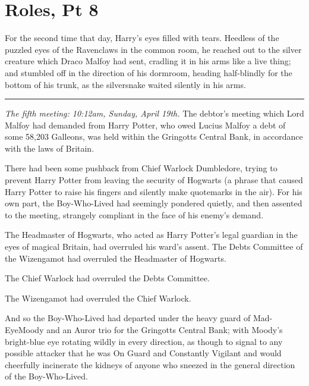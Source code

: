 \chapter{Roles, Pt 8}
For the second time that day, Harry's eyes filled with tears. Heedless of the puzzled eyes of the Ravenclaws in the common room, he reached out to the silver creature which Draco Malfoy had sent, cradling it in his arms like a live thing; and stumbled off in the direction of his dormroom, heading half-blindly for the bottom of his trunk, as the silversnake waited silently in his arms.

\begin{center}\rule{3in}{0.4pt}\end{center}

\emph{The fifth meeting: 10:12am, Sunday, April 19th.}
The debtor's meeting which Lord Malfoy had demanded from Harry Potter, who owed Lucius Malfoy a debt of some 58,203 Galleons, was held within the Gringotts Central Bank, in accordance with the laws of Britain.

There had been some pushback from Chief Warlock Dumbledore, trying to prevent Harry Potter from leaving the security of Hogwarts (a phrase that caused Harry Potter to raise his fingers and silently make quotemarks in the air). For his own part, the Boy-Who-Lived had seemingly pondered quietly, and then assented to the meeting, strangely compliant in the face of his enemy's demand.

The Headmaster of Hogwarts, who acted as Harry Potter's legal guardian in the eyes of magical Britain, had overruled his ward's assent.
The Debts Committee of the Wizengamot had overruled the Headmaster of Hogwarts.

The Chief Warlock had overruled the Debts Committee.

The Wizengamot had overruled the Chief Warlock.

And so the Boy-Who-Lived had departed under the heavy guard of Mad-EyeMoody and an Auror trio for the Gringotts Central Bank; with Moody's bright-blue eye rotating wildly in every direction, as though to signal to any possible attacker that he was On Guard and Constantly Vigilant and would cheerfully incinerate the kidneys of anyone who sneezed in the general direction of the Boy-Who-Lived.

